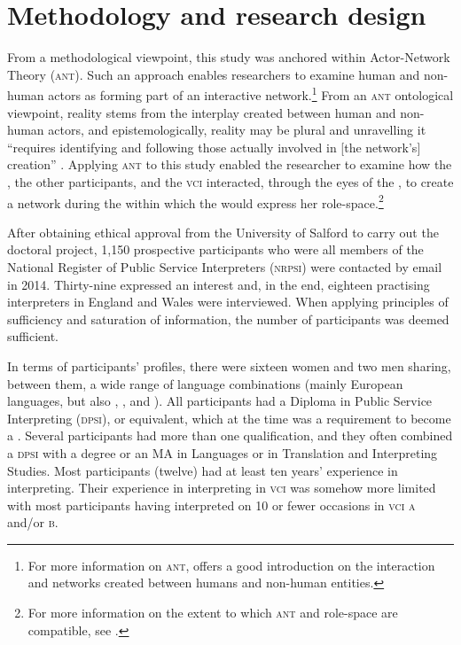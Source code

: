 \documentclass[output=paper]{langsci/langscibook}
\begin{document}
\section{Methodology and research design}
\label{sec:devaux:4}
From a methodological viewpoint, this study was anchored within Actor-Net\-work Theory (\textsc{ant}). Such an approach enables researchers to examine human and non-human actors as forming part of an interactive network.\footnote{For more information on \textsc{ant}, \citet{Latour2005} offers a good introduction on the interaction and networks created between humans and non-human entities.} From an \textsc{ant} ontological viewpoint, reality stems from the interplay created between human and non-human actors, and epistemologically, reality may be plural and unravelling it “requires identifying and following those actually involved in [the network’s] creation” \citep[112]{Bonner2013}. Applying \textsc{ant} to this study enabled the researcher to examine how the , the other  participants, and the \textsc{vci}  interacted, through the eyes of the , to create a network during the  within which the  would express her role-space.\footnote{For more information on the extent to which \textsc{ant} and role-space are compatible, see \citet{Devaux2017b}.} 

After obtaining ethical approval from the University of Salford to carry out the doctoral project, 1,150 prospective participants who were all members of the National Register of Public Service Interpreters (\textsc{nrpsi}) were contacted by email in 2014. Thirty-nine expressed an interest and, in the end, eighteen practising  interpreters in England and Wales were interviewed. When applying  principles of sufficiency and saturation of information, the number of participants was deemed sufficient. 

In terms of participants’ profiles, there were sixteen women and two men sharing, between them, a wide range of language combinations (mainly European languages, but also , , and ). All participants had a Diploma in Public Service Interpreting (\textsc{dpsi}), or equivalent, which at the time was a requirement to become a . Several participants had more than one qualification, and they often combined a \textsc{dpsi} with a degree or an MA in Languages or in Translation and Interpreting Studies. Most participants (twelve) had at least ten years’ experience in  interpreting. Their experience in interpreting in \textsc{vci} was somehow more limited with most participants having interpreted on 10 or fewer occasions in \textsc{vci a} and/or \textsc{b}.  
\end{document}
